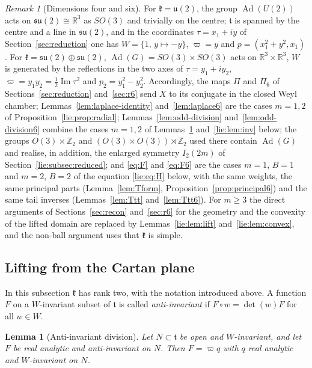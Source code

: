 \documentclass[11pt]{amsart}
\newtheorem{lemma}[theorem]{Lemma}
\theoremstyle{definition}
\theoremstyle{remark}
\newtheorem{remark}[theorem]{Remark}
\numberwithin{equation}{section}
\newcommand{\R}{\mathbb{R}}
\newcommand{\Z}{\mathbb{Z}}
\DeclareMathOperator{\im}{Im}
\newcommand{\Ad}{\operatorname{Ad}}
\newcommand{\kf}{\mathfrak{k}}
\newcommand{\tf}{\mathfrak{t}}
\begin{document}
\begin{remark}[Dimensions four and six]\label{lie:rem:m12}
For $\kf=\mathfrak u(2)$, the group $\Ad(U(2))$ acts on $\mathfrak{su}(2)\cong\R^3$ as $SO(3)$ and trivially on the centre; $\tf$ is spanned by the centre and a line in $\mathfrak{su}(2)$, and in the coordinates $\tau=x_1+iy$ of Section~\ref{sec:reduction} one has $W=\{1,\,y\mapsto-y\}$, $\varpi=y$ and $p=(x_1^2+y^2,x_1)$. For $\kf=\mathfrak{su}(2)\oplus\mathfrak{su}(2)$, $\Ad(G)=SO(3)\times SO(3)$ acts on $\R^3\times\R^3$, $W$ is generated by the reflections in the two axes of $\tau=y_1+iy_2$, $\varpi=y_1y_2=\frac12\im\tau^2$ and $p_2=y_1^2-y_2^2$. Accordingly, the maps $\Pi$ and $\Pi_6$ of Sections~\ref{sec:reduction} and~\ref{sec:r6} send $X$ to its conjugate in the closed Weyl chamber; Lemmas~\ref{lem:laplace-identity} and~\ref{lem:laplace6} are the cases $m=1,2$ of Proposition~\ref{lie:prop:radial}; Lemmas~\ref{lem:odd-division} and~\ref{lem:odd-division6} combine the cases $m=1,2$ of Lemmas~\ref{lie:lem:division} and~\ref{lie:lem:inv} below; the groups $O(3)\times\Z_2$ and $(O(3)\times O(3))\rtimes\Z_2$ used there contain $\Ad(G)$ and realise, in addition, the enlarged symmetry $I_2(2m)$ of Section~\ref{lie:subsec:reduced}; and \eqref{eq:F} and \eqref{eq:F6} are the cases $m=1$, $B=1$ and $m=2$, $B=2$ of the equation \eqref{lie:eq:H} below, with the same weights, the same principal parts (Lemma~\ref{lem:Tform}, Proposition~\ref{prop:principal6}) and the same tail inverses (Lemmas~\ref{lem:Ttt} and~\ref{lem:Ttt6}). For $m\geq3$ the direct arguments of Sections~\ref{sec:recon} and~\ref{sec:r6} for the geometry and the convexity of the lifted domain are replaced by Lemmas~\ref{lie:lem:lift} and~\ref{lie:lem:convex}, and the non-ball argument uses that $\kf$ is simple.
\end{remark}

\subsection{Lifting from the Cartan plane}\label{lie:subsec:lift}

In this subsection $\kf$ has rank two, with the notation introduced above. A function $F$ on a $W$-invariant subset of $\tf$ is called \emph{anti-invariant} if $F\circ w=\det(w)F$ for all $w\in W$.

\begin{lemma}[Anti-invariant division]\label{lie:lem:division}
Let $N\subset\tf$ be open and $W$-invariant, and let $F$ be real analytic and anti-invariant on $N$. Then $F=\varpi q$ with $q$ real analytic and $W$-invariant on $N$.
\end{lemma}
\end{document}
